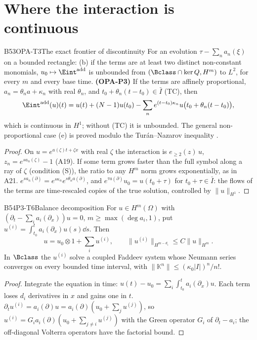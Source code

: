 \section{Where the interaction is continuous}

\begin{dimcard}{B53}{OPA-T3}{The exact frontier of discontinuity}{\proved}{}
\label{dim:OPA-P3}%
For an evolution $\tau-\sum_na_n(\xi)$ on a bounded rectangle: (b) if the terms are at least two distinct non-constant monomials, $u_0\mapsto\Eint^{\mathrm{add}}$ is unbounded from $(\Bclass\cap\ker Q,H^m)$ to $L^2$, for every $m$ and every base time. \textbf{(OPA-P3)} If the terms are affinely proportional, $a_n=\theta_na+\kappa_n$ with real $\theta_n$, and $t_0+\theta_n(t-t_0)\in\bar I$ (TC), then
\[
\Eint^{\mathrm{add}}(u)(t)=u(t)+(N-1)u(t_0)-\sum_ne^{(t-t_0)\kappa_n}u\big(t_0+\theta_n(t-t_0)\big),
\]
which is continuous in $H^1$; without (TC) it is unbounded. The general non-proportional case (e) is proved modulo the Tur\'an--Nazarov inequality \cf.
\end{dimcard}
\begin{proof}
On $u=e^{a(\zeta)t+\zeta x}$ with real $\zeta$ the interaction is $e_{\ge2}(z)\,u$, $z_n=e^{sa_n(\zeta)}-1$ (A19). If some term grows faster than the full symbol along a ray of $\zeta$ (condition (S)), the ratio to any $H^m$ norm grows exponentially, as in A21.
$e^{sa_n(\partial)}=e^{s\kappa_n}e^{s\theta_na(\partial)}$, and $e^{\tau a(\partial)}u_0=u(t_0+\tau)$ for $t_0+\tau\in\bar I$: the flows of the terms are time-rescaled copies of the true solution, controlled by $\|u\|_{H^1}$.
\end{proof}

\begin{dimcard}{B54}{P3-T6}{Balance decomposition}{\pw}{}
For $u\in H^m(\Omega)$ with $(\partial_t-\sum_ia_i(\partial_x))u=0$, $m\ge\max(\deg a_i,1)$, put $u^{(i)}=\int_{t_0}^ta_i(\partial_x)u(s)\dd s$. Then
\[
u=u_0\otimes1+\sum_iu^{(i)},\qquad \|u^{(i)}\|_{H^{m-d_i}}\le C\|u\|_{H^m}.
\]
In $\Bclass$ the $u^{(i)}$ solve a coupled Faddeev system whose Neumann series converges on every bounded time interval, with $\|\mathbb K^n\|\le(\kappa_0|I|)^n/n!$.
\end{dimcard}
\begin{proof}
Integrate the equation in time: $u(t)-u_0=\sum_i\int_{t_0}^ta_i(\partial_x)u$. Each term loses $d_i$ derivatives in $x$ and gains one in $t$.
$\partial_tu^{(i)}=a_i(\partial)u=a_i(\partial)(u_0+\sum_ju^{(j)})$, so $u^{(i)}=G_ia_i(\partial)(u_0+\sum_{j\ne i}u^{(j)})$ with the Green operator $G_i$ of $\partial_t-a_i$; the off-diagonal Volterra operators have the factorial bound.
\end{proof}

